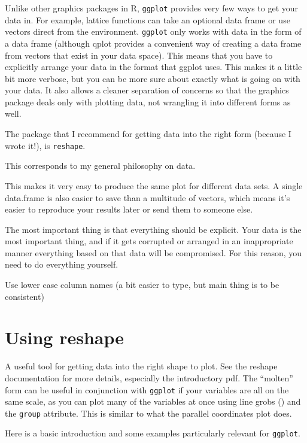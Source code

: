 Unlike other graphics packages in R, {\tt ggplot} provides very few ways to get your data in.  For example, lattice functions can take an optional data frame or use vectors direct from the environment.  {\tt ggplot} only works with data in the form of a data frame (although qplot provides a convenient way of creating a data frame from vectors that exist in your data space).  This means that you have to explicitly arrange your data in the format that ggplot uses.  This makes it a little bit more verbose, but you can be more sure about exactly what is going on with your data.  It also allows a cleaner separation of concerns so that the graphics package deals only with plotting data, not wrangling it into different forms as well.

The package that I recommend for getting data into the right form (because I wrote it!), is {\tt reshape}.

This corresponds to my general philosophy on data.  

This makes it very easy to produce the same plot for different data sets.  A single data.frame is also easier to save than a multitude of vectors, which means it's easier to reproduce your results later or send them to someone else.  

The most important thing is that everything should be explicit.  Your data is the most important thing, and if it gets corrupted or arranged in an inappropriate manner everything based on that data will be compromised.  For this reason, you need to do everything yourself.

Use lower case column names (a bit easier to type, but main thing is to be consistent)

\section{Using reshape}\label{sec:using_reshape}

A useful tool for getting data into the right shape to plot.  See the reshape documentation for more details, especially the introductory pdf.  The ``molten'' form can be useful in conjunction with {\tt ggplot} if your variables are all on the same scale, as you can plot many of the variables at once using line grobs () and the {\tt group} attribute.  This is similar to what the parallel coordinates plot does.

Here is a basic introduction and some examples particularly relevant for {\tt ggplot}.


